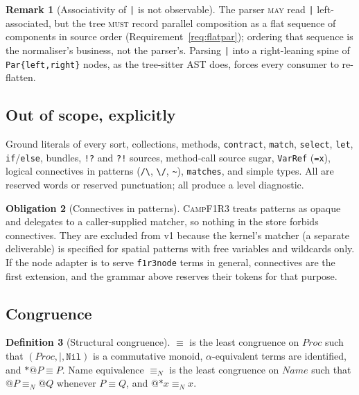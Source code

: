 \documentclass[11pt,a4paper]{article}
\newcommand{\code}[1]{\texttt{#1}}
\newcommand{\Camp}{\textsc{CampF1R3}}
\newcommand{\MUST}{\textsc{must}}
\newcommand{\MAY}{\textsc{may}}
\theoremstyle{definition}
\newtheorem{definition}{Definition}[section]
\newtheorem{obligation}[definition]{Obligation}
\newtheorem{remark}[definition]{Remark}
\theoremstyle{plain}
\begin{document}
\begin{remark}[Associativity of \code{|} is not observable]
The parser \MAY{} read \code{|} left-associated, but the tree \MUST{} record
parallel composition as a flat sequence of components in source order
(Requirement~\ref{req:flatpar}); ordering that sequence is the normaliser's
business, not the parser's. Parsing \code{|} into a right-leaning spine of
\code{Par\{left,right\}} nodes, as the tree-sitter AST does, forces every
consumer to re-flatten.
\end{remark}

\subsection{Out of scope, explicitly}

Ground literals of every sort, collections, methods, \code{contract},
\code{match}, \code{select}, \code{let}, \code{if}/\code{else}, bundles,
\code{!?} and \code{?!} sources, method-call source sugar, \code{VarRef}
(\code{=x}), logical connectives in patterns (\code{/\textbackslash},
\code{\textbackslash/}, \code{\~{}}), \code{matches}, and simple types. All are
reserved words or reserved punctuation; all produce a level diagnostic.

\begin{obligation}[Connectives in patterns]\label{obl:conn}
\Camp{} treats patterns as opaque and delegates to a caller-supplied matcher, so
nothing in the store forbids connectives. They are excluded from v1 because the
kernel's matcher (a separate deliverable) is specified for spatial patterns with
free variables and wildcards only. If the node adapter is to serve
\code{f1r3node} terms in general, connectives are the first extension, and the
grammar above reserves their tokens for that purpose.
\end{obligation}

\subsection{Congruence}

\begin{definition}[Structural congruence]\label{def:cong}
$\equiv$ is the least congruence on $\mathit{Proc}$ such that
$(\mathit{Proc},\code{|},\code{Nil})$ is a commutative monoid, $\alpha$-equivalent
terms are identified, and $*@P \equiv P$. Name equivalence $\equiv_N$ is the
least congruence on $\mathit{Name}$ such that $@P \equiv_N @Q$ whenever
$P\equiv Q$, and $@{*x} \equiv_N x$.
\end{definition}
\end{document}
